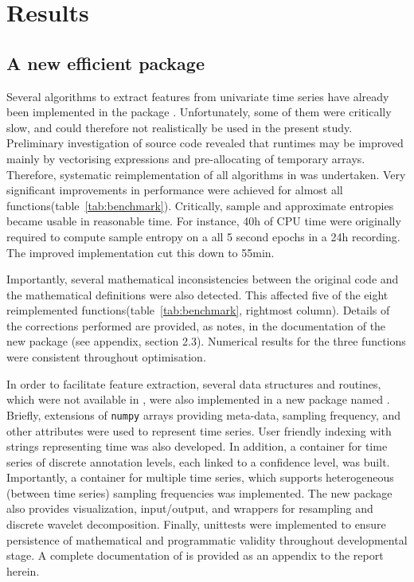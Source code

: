 
\section{Results} \label{results}

\subsection{A new efficient \py{} package}
Several algorithms to extract features from univariate time series have already
been implemented in the \py{} package \pyeeg{}\cite{bao_pyeeg:_2011}.
Unfortunately, some of them were critically slow, and could therefore not realistically be used in the present study.
Preliminary investigation of \pyeeg{} source code revealed that runtimes may be improved mainly by vectorising expressions and pre-allocating of temporary arrays.
Therefore, systematic reimplementation of all algorithms in \pyeeg{} was undertaken.
Very significant improvements in performance were achieved for almost all functions(table~\ref{tab:benchmark}).
Critically, sample and approximate entropies\cite{richman_physiological_2000} became usable in
reasonable time.
For instance, 40h of CPU time were originally required to compute sample entropy on a all 5 second epochs in a 24h recording.
The improved implementation cut this down to 55min.


Importantly, several mathematical inconsistencies between the original code and the mathematical definitions were also detected.
This affected five of the eight reimplemented functions(table~\ref{tab:benchmark}, rightmost column).
Details of the corrections performed are provided, as notes, in the documentation of the new package (see appendix, section 2.3).
Numerical results for the three functions were consistent throughout optimisation.

In order to facilitate feature extraction, several data structures and routines, which were not 
available in \pyeeg{}, were also implemented in a new \py{} package named \pr{}.
Briefly, extensions of \texttt{numpy} arrays\cite{walt_numpy_2011} providing
meta-data, sampling frequency, and other attributes were used to represent time series.
User friendly indexing with strings representing time was also developed.
In addition, a container for time series of discrete annotation levels, each linked to a confidence level, was built.
Importantly, a container for multiple time series, which supports heterogeneous (between time series) sampling frequencies was implemented.
The new package also provides visualization, input/output, and wrappers for resampling and discrete wavelet decomposition.
Finally, unittests were implemented to ensure persistence of mathematical and programmatic validity throughout developmental stage.
A complete documentation of \pr{} is provided as an appendix to the report herein.

